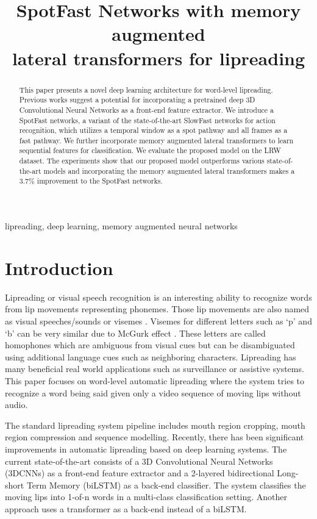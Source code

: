 \documentclass{article}
\title{SpotFast Networks with memory augmented \\ lateral transformers   for lipreading}
\begin{document}
\maketitle
\begin{abstract}
This paper presents a novel deep learning architecture for word-level lipreading. Previous works suggest a potential for incorporating a pretrained deep 3D Convolutional Neural Networks as a front-end feature extractor. We introduce a SpotFast networks, a variant of the state-of-the-art SlowFast networks for action recognition, which utilizes a temporal window as a spot pathway and all frames as a fast pathway. We further incorporate memory augmented lateral transformers to learn sequential features for classification. We evaluate the proposed model on the LRW dataset. The experiments show that our proposed model outperforms various state-of-the-art models and incorporating the memory augmented lateral transformers makes a $3.7\%$ improvement to the SpotFast networks.
\end{abstract}
\begin{keywords}
lipreading, deep learning, memory augmented neural networks
\end{keywords}
\section{Introduction}
Lipreading or visual speech recognition is an interesting ability to recognize words from lip movements representing phonemes. Those lip movements are also named as visual speeches/sounds or visemes \cite{taylor2012dynamic, bear2017phoneme}. Visemes for different letters such as `p' and `b' can be very similar due to McGurk effect \cite{mcgurk1976hearing}. These letters are called homophones which are ambiguous from visual cues but can be disambiguated using additional language cues such as neighboring characters. Lipreading has many beneficial real world applications such as surveillance or assistive systems. This paper focuses on word-level automatic lipreading where the system tries to recognize a word being said given only a video sequence of moving lips without audio. 

The standard lipreading system pipeline includes mouth region cropping, mouth region compression and sequence modelling. Recently, there has been significant improvements in automatic lipreading based on deep learning systems. The current state-of-the-art \cite{weng2019learning, petridis2018end} consists of a 3D Convolutional Neural Networks (3DCNNs) as a front-end feature extractor and a 2-layered bidirectional Long-short Term Memory (biLSTM) as a back-end classifier. The system classifies the moving lips into 1-of-n words in a multi-class classification setting. Another approach \cite{Zhang_2019_ICCV} uses a transformer as a back-end instead of a biLSTM. 
\end{document}
